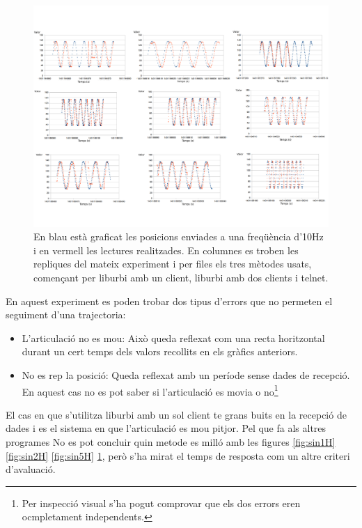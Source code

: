 \documentclass[12pt,a4paper,final,twoside]{article}
\begin{document}
\begin{figure}[H]
	\centering
    \includegraphics[scale=0.3]{images/sin10H.pdf}
	 \caption{En blau està graficat les posicions enviades a una freqüència d'10Hz i en vermell les lectures realitzades. En columnes es troben les repliques del mateix experiment i per files els tres mètodes usats, començant per liburbi amb un client, liburbi amb dos clients i telnet.}
  \label{fig:sin10H}
\end{figure}
En aquest experiment es poden trobar dos tipus d'errors que no permeten el seguiment d'una trajectoria:
\begin{itemize}
\item L'articulació no es mou: Això queda reflexat com una recta horitzontal durant un cert temps dels valors recollits en els gràfics anteriors.
\item No es rep la posició: Queda reflexat amb un període sense dades de recepció. En aquest cas no es pot saber si l'articulació es movia o no\footnote{Per inspecció visual s'ha pogut comprovar que els dos errors eren ocmpletament independents.}
\end{itemize}
El cas en que s'utilitza liburbi amb un sol client te grans buits en la recepció de dades i es el sistema en que l'articulació es mou pitjor. Pel que fa als altres programes No es pot concluir quin metode es milló amb les figures \ref{fig:sin1H} \ref{fig:sin2H} \ref{fig:sin5H} \ref{fig:sin10H}, però s'ha mirat el temps de resposta com un altre criteri d'avaluació.
 
\end{document}
